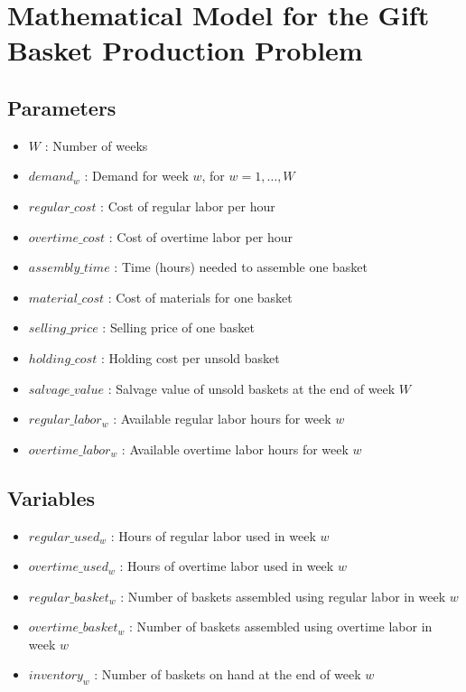 \documentclass{article}
\begin{document}
\section*{Mathematical Model for the Gift Basket Production Problem}

\subsection*{Parameters}
\begin{itemize}
    \item \( W \) : Number of weeks
    \item \( demand_w \) : Demand for week \( w \), for \( w = 1, \ldots, W \)
    \item \( regular\_cost \) : Cost of regular labor per hour
    \item \( overtime\_cost \) : Cost of overtime labor per hour
    \item \( assembly\_time \) : Time (hours) needed to assemble one basket
    \item \( material\_cost \) : Cost of materials for one basket
    \item \( selling\_price \) : Selling price of one basket
    \item \( holding\_cost \) : Holding cost per unsold basket
    \item \( salvage\_value \) : Salvage value of unsold baskets at the end of week \( W \)
    \item \( regular\_labor_w \) : Available regular labor hours for week \( w \)
    \item \( overtime\_labor_w \) : Available overtime labor hours for week \( w \)
\end{itemize}

\subsection*{Variables}
\begin{itemize}
    \item \( regular\_used_w \) : Hours of regular labor used in week \( w \)
    \item \( overtime\_used_w \) : Hours of overtime labor used in week \( w \)
    \item \( regular\_basket_w \) : Number of baskets assembled using regular labor in week \( w \)
    \item \( overtime\_basket_w \) : Number of baskets assembled using overtime labor in week \( w \)
    \item \( inventory_w \) : Number of baskets on hand at the end of week \( w \)
\end{itemize}
\end{document}
